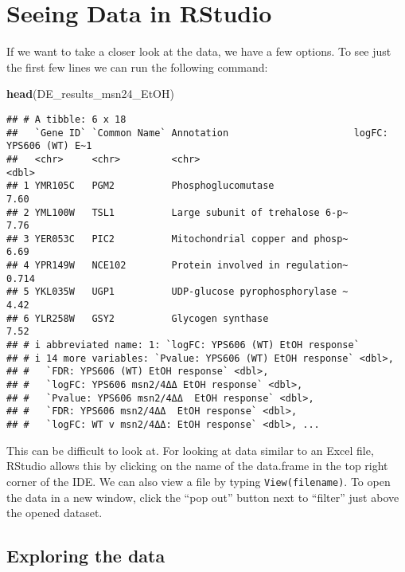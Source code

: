 \documentclass[
]{book}
\newenvironment{Shaded}{\begin{snugshade}}{\end{snugshade}}
\newcommand{\FunctionTok}[1]{\textcolor[rgb]{0.13,0.29,0.53}{\textbf{#1}}}
\newcommand{\NormalTok}[1]{#1}
\theoremstyle{definition}
\theoremstyle{definition}
\theoremstyle{definition}
\theoremstyle{definition}
\theoremstyle{remark}
\begin{document}
\hypertarget{seeing-data-in-rstudio}{%
\chapter{Seeing Data in RStudio}\label{seeing-data-in-rstudio}}

If we want to take a closer look at the data, we have a few options. To see just the first few lines we can run the following command:

\begin{Shaded}
\begin{Highlighting}[]
\FunctionTok{head}\NormalTok{(DE\_results\_msn24\_EtOH)}
\end{Highlighting}
\end{Shaded}

\begin{verbatim}
## # A tibble: 6 x 18
##   `Gene ID` `Common Name` Annotation                      logFC: YPS606 (WT) E~1
##   <chr>     <chr>         <chr>                                            <dbl>
## 1 YMR105C   PGM2          Phosphoglucomutase                               7.60 
## 2 YML100W   TSL1          Large subunit of trehalose 6-p~                  7.76 
## 3 YER053C   PIC2          Mitochondrial copper and phosp~                  6.69 
## 4 YPR149W   NCE102        Protein involved in regulation~                  0.714
## 5 YKL035W   UGP1          UDP-glucose pyrophosphorylase ~                  4.42 
## 6 YLR258W   GSY2          Glycogen synthase                                7.52 
## # i abbreviated name: 1: `logFC: YPS606 (WT) EtOH response`
## # i 14 more variables: `Pvalue: YPS606 (WT) EtOH response` <dbl>,
## #   `FDR: YPS606 (WT) EtOH response` <dbl>,
## #   `logFC: YPS606 msn2/4ΔΔ EtOH response` <dbl>,
## #   `Pvalue: YPS606 msn2/4ΔΔ  EtOH response` <dbl>,
## #   `FDR: YPS606 msn2/4ΔΔ  EtOH response` <dbl>,
## #   `logFC: WT v msn2/4ΔΔ: EtOH response` <dbl>, ...
\end{verbatim}

This can be difficult to look at. For looking at data similar to an Excel file, RStudio allows this by clicking on the name of the data.frame in the top right corner of the IDE. We can also view a file by typing \texttt{View(filename)}. To open the data in a new window, click the ``pop out'' button next to ``filter'' just above the opened dataset.

\hypertarget{exploring-the-data}{%
\section{Exploring the data}\label{exploring-the-data}}
\end{document}
